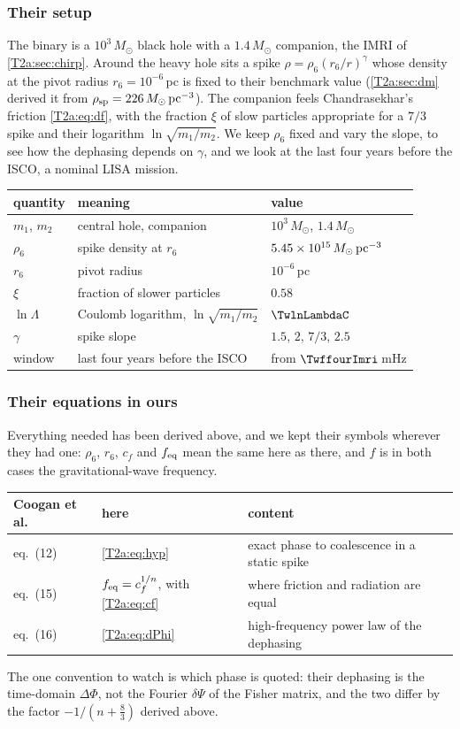 \subsubsection*{Their setup}
The binary is a $10^3\,M_\odot$ black hole with a $1.4\,M_\odot$ companion, the IMRI of \cref{T2a:sec:chirp}. Around the heavy hole sits a spike $\rho=\rho_6(r_6/r)^\gamma$ whose density at the pivot radius $r_6=10^{-6}$\,pc is fixed to their benchmark value (\cref{T2a:sec:dm} derived it from $\rho_{\rm sp}=226\,M_\odot\,{\rm pc}^{-3}$). The companion feels Chandrasekhar's friction \eqref{T2a:eq:df}, with the fraction $\xi$ of slow particles appropriate for a $7/3$ spike and their logarithm $\ln\sqrt{m_1/m_2}$. We keep $\rho_6$ fixed and vary the slope, to see how the dephasing depends on $\gamma$, and we look at the last four years before the ISCO, a nominal LISA mission.
\begin{center}
\small
\begin{tabular}{@{}lll@{}}
\toprule
quantity & meaning & value\\\midrule
$m_1$, $m_2$ & central hole, companion & $10^3\,M_\odot$, $1.4\,M_\odot$\\
$\rho_6$ & spike density at $r_6$ & $5.45\times10^{15}\,M_\odot\,{\rm pc}^{-3}$\\
$r_6$ & pivot radius & $10^{-6}$\,pc\\
$\xi$ & fraction of slower particles & $0.58$\\
$\ln\Lambda$ & Coulomb logarithm, $\ln\sqrt{m_1/m_2}$ & $\TwlnLambdaC$\\
$\gamma$ & spike slope & $1.5$, $2$, $7/3$, $2.5$\\
window & last four years before the ISCO & from $\TwffourImri$\,mHz\\
\bottomrule
\end{tabular}
\end{center}

\subsubsection*{Their equations in ours}
Everything needed has been derived above, and we kept their symbols wherever they had one: $\rho_6$, $r_6$, $c_f$ and $f_{\rm eq}$ mean the same here as there, and $f$ is in both cases the gravitational-wave frequency.
\begin{center}
\small
\begin{tabular}{@{}lll@{}}
\toprule
Coogan et al. & here & content\\\midrule
eq.~(12) & \eqref{T2a:eq:hyp} & exact phase to coalescence in a static spike\\
eq.~(15) & $f_{\rm eq}=c_f^{1/n}$, with \eqref{T2a:eq:cf} & where friction and radiation are equal\\
eq.~(16) & \eqref{T2a:eq:dPhi} & high-frequency power law of the dephasing\\
\bottomrule
\end{tabular}
\end{center}
The one convention to watch is which phase is quoted: their dephasing is the time-domain $\Delta\Phi$, not the Fourier $\delta\Psi$ of the Fisher matrix, and the two differ by the factor $-1/(n+\tfrac83)$ derived above.


